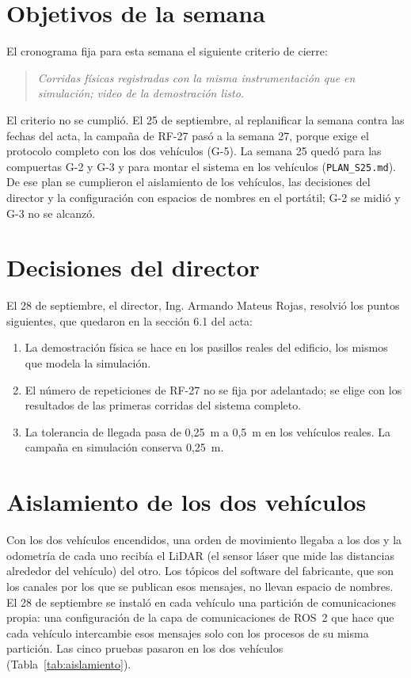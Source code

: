 \documentclass[12pt,letterpaper]{article}
\begin{document}
\section{Objetivos de la semana}
\label{sec:objetivos}

El cronograma fija para esta semana el siguiente criterio de cierre:

\begin{quote}
\textit{Corridas físicas registradas con la misma instrumentación que en simulación; video de la demostración listo.}
\end{quote}

El criterio no se cumplió. El 25 de septiembre, al replanificar la semana contra las fechas del acta, la campaña de RF-27 pasó a la semana 27, porque exige el protocolo completo con los dos vehículos (G-5). La semana 25 quedó para las compuertas G-2 y G-3 y para montar el sistema en los vehículos (\texttt{PLAN\_S25.md}). De ese plan se cumplieron el aislamiento de los vehículos, las decisiones del director y la configuración con espacios de nombres en el portátil; G-2 se midió y G-3 no se alcanzó.

\section{Decisiones del director}
\label{sec:decisiones}

El 28 de septiembre, el director, Ing. Armando Mateus Rojas, resolvió los puntos siguientes, que quedaron en la sección 6.1 del acta:

\begin{enumerate}[leftmargin=*]
    \item La demostración física se hace en los pasillos reales del edificio, los mismos que modela la simulación.
    \item El número de repeticiones de RF-27 no se fija por adelantado; se elige con los resultados de las primeras corridas del sistema completo.
    \item La tolerancia de llegada pasa de 0,25~m a 0,5~m en los vehículos reales. La campaña en simulación conserva 0,25~m.
\end{enumerate}

\section{Aislamiento de los dos vehículos}
\label{sec:aislamiento}

Con los dos vehículos encendidos, una orden de movimiento llegaba a los dos y la odometría de cada uno recibía el LiDAR (el sensor láser que mide las distancias alrededor del vehículo) del otro. Los tópicos del software del fabricante, que son los canales por los que se publican esos mensajes, no llevan espacio de nombres. El 28 de septiembre se instaló en cada vehículo una partición de comunicaciones propia: una configuración de la capa de comunicaciones de ROS~2 que hace que cada vehículo intercambie esos mensajes solo con los procesos de su misma partición. Las cinco pruebas pasaron en los dos vehículos (Tabla~\ref{tab:aislamiento}).
\end{document}

